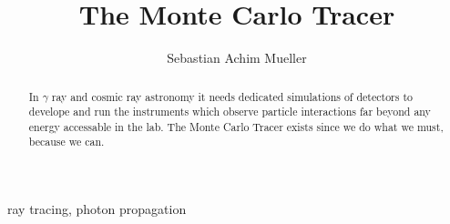 \documentclass[review]{elsarticle}
\begin{document}
\newcommand{\CppFileStartEnd}[3]{%
    \begin{footnotesize}
    \hfill\path{#1}\\
    \end{footnotesize}
}

\makeatletter
{}
\def\lst@SkipToFirst{%
    \lst@ifmatchrangestart\c@lstnumber=\numexpr-1+\lst@firstline\fi
    \ifnum \lst@lineno<\lst@firstline
        \def\lst@next{\lst@BeginDropInput\lst@Pmode
        \lst@Let{13}\lst@MSkipToFirst
        \lst@Let{10}\lst@MSkipToFirst}%
        \expandafter\lst@next
    \else
        \expandafter\lst@BOLGobble
    \fi}
\makeatother

\begin{frontmatter}

\title{%
	The Monte Carlo Tracer%
}


\author[mymainaddress,mysecondaryaddress]{Sebastian Achim Mueller}


\address[mymainaddress]{Institute for Particle Physics, ETH, Otto-Stern-Weg 5, 8093 Zuerich, Switzerland}
\address[mysecondaryaddress]{Experimental Physics 5b, TU Dortmund, Otto-Hahn-Strasse 4, 44227 Dortmund, Germany}
\begin{abstract}
%
In $\gamma$ ray and cosmic ray astronomy it needs dedicated simulations of detectors to develope and run the instruments which observe particle interactions far beyond any energy accessable in the lab.
%
The Monte Carlo Tracer exists since we do what we must, because we can.
%
\end{abstract}
\begin{keyword}
ray tracing, photon propagation
%
\end{keyword}
\end{frontmatter}
\end{document}
